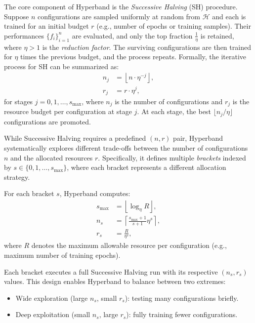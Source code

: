 The core component of Hyperband is the \textit{Successive Halving} (SH) procedure. Suppose $n$ configurations are sampled uniformly at random from $\mathcal{H}$ and each is trained for an initial budget $r$ (e.g., number of epochs or training samples). Their performances $\{f_i\}_{i=1}^{n}$ are evaluated, and only the top fraction $\frac{1}{\eta}$ is retained, where $\eta > 1$ is the \textit{reduction factor}. The surviving configurations are then trained for $\eta$ times the previous budget, and the process repeats. Formally, the iterative process for SH can be summarized as:
\begin{align}
	n_j & = \left\lfloor n \cdot \eta^{-j} \right\rfloor, \\
	r_j & = r \cdot \eta^{j},
	\label{eq:successive_halving}
\end{align}
for stages $j = 0, 1, \ldots, s_{\max}$, where $n_j$ is the number of configurations and $r_j$ is the resource budget per configuration at stage $j$. At each stage, the best $\lfloor n_j / \eta \rfloor$ configurations are promoted.

While Successive Halving requires a predefined $(n, r)$ pair, Hyperband systematically explores different trade-offs between the number of configurations $n$ and the allocated resources $r$. Specifically, it defines multiple \textit{brackets} indexed by $s \in \{0, 1, \ldots, s_{\max}\}$, where each bracket represents a different allocation strategy.

For each bracket $s$, Hyperband computes:
\begin{align}
	s_{\max} & = \left\lfloor \log_{\eta} R \right\rfloor,                   \\
	n_s      & = \left\lceil \frac{s_{\max} + 1}{s + 1} \eta^s \right\rceil, \\
	r_s      & = \frac{R}{\eta^s},
	\label{eq:hyperband_parameters}
\end{align}
where $R$ denotes the maximum allowable resource per configuration (e.g., maximum number of training epochs).

Each bracket executes a full Successive Halving run with its respective $(n_s, r_s)$ values. This design enables Hyperband to balance between two extremes:
\begin{itemize}
	\item Wide exploration (large $n_s$, small $r_s$): testing many configurations briefly.
	\item Deep exploitation (small $n_s$, large $r_s$): fully training fewer configurations.
\end{itemize}

